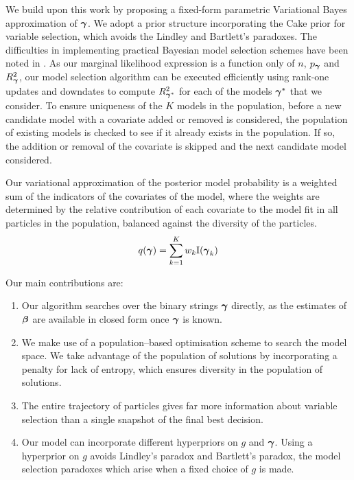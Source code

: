 We build upon this work by proposing a fixed-form parametric Variational Bayes
approximation of ${\boldsymbol \gamma}$. We adopt a prior structure incorporating the Cake
prior for variable selection, which avoids the Lindley and Bartlett's
paradoxes. The difficulties in implementing practical Bayesian model selection
schemes have been noted in \cite{Chipman2014}. As our marginal likelihood
expression is a function only of $n$, $p_{\boldsymbol \gamma}$ and $R^2_{\boldsymbol \gamma}$, our model
selection algorithm can be executed efficiently using rank-one updates and
downdates to compute $R^2_{{\boldsymbol \gamma}^*}$ for each of the models ${\boldsymbol \gamma}^*$ that
we consider. To ensure uniqueness of the $K$ models in the population, before a
new candidate model with a covariate added or removed is considered, the
population of existing models is checked to see if it already exists in the
population. If so, the addition or removal of the covariate is skipped and the
next candidate model considered.

Our variational approximation of the posterior model probability is a weighted
sum of the indicators of the covariates of the model, where the weights are
determined by the relative contribution of each covariate to the model fit in
all particles in the population, balanced against the diversity of the
particles.
\[
	q({\boldsymbol \gamma}) = \sum_{k=1}^K w_k \text{I}({\boldsymbol \gamma}_k)
\]


Our main contributions are:

\begin{enumerate}
    \item Our algorithm searches over the binary strings ${\boldsymbol \gamma}$ directly, as
        the estimates of ${\boldsymbol \beta}$ are available in closed form once ${\boldsymbol \gamma}$
        is known.

    \item We make use of a population--based optimisation scheme to search the
        model space. We take advantage of the population of solutions by
        incorporating a penalty for lack of entropy, which ensures diversity in
        the population of solutions.

    \item The entire trajectory of particles gives far more information about
        variable selection than a single snapshot of the final best decision.

    \item Our model can incorporate different hyperpriors on $g$ and ${\boldsymbol \gamma}$.
Using a hyperprior on $g$ avoids Lindley's paradox and Bartlett's paradox, the
model selection paradoxes which arise when a fixed choice of $g$ is made.
\end{enumerate}

